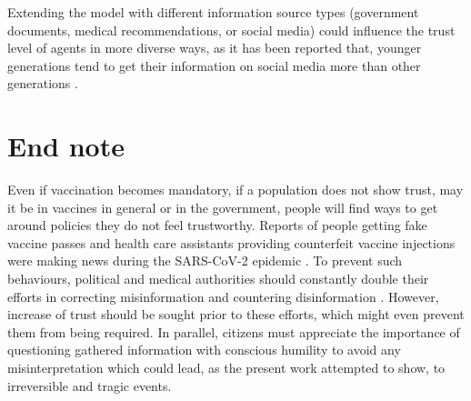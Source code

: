Extending the model with different information source types (government documents, medical recommendations, or social media) could influence the trust level of agents in more diverse ways, as it has been reported that, younger generations tend to get their information on social media more than other generations \cite{okeeffe_impact_2011, roozenbeek_susceptibility_2020}.



\section{End note}

Even if vaccination becomes mandatory, if a population does not show trust, may it be in vaccines in general or in the government, people will find ways to get around policies they do not feel trustworthy. Reports of people getting fake vaccine passes and health care assistants providing counterfeit vaccine injections were making news during the SARS-CoV-2 epidemic \cite{davies_fake_covid_passes_2021, cnn_germany_fake_vaccines_2021, tondo_italy_fake_vaccines_2022}.
To prevent such behaviours, political and medical authorities should constantly double their efforts in correcting misinformation and countering disinformation \cite{abd-alrazaq_top_2020}. However, increase of trust should be sought prior to these efforts, which might even prevent them from being required.
In parallel, citizens must appreciate the importance of questioning gathered information with conscious humility to avoid any misinterpretation which could lead, as the present work attempted to show, to irreversible and tragic events.
